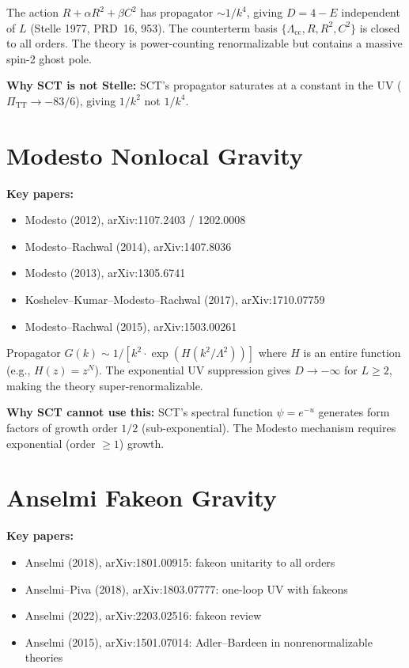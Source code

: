 \documentclass[12pt,a4paper]{article}
\begin{document}
The action $R + \alpha R^2 + \beta C^2$ has propagator $\sim 1/k^4$,
giving $D = 4 - E$ independent of $L$ (Stelle 1977, PRD~16, 953).
The counterterm basis $\{\Lambda_{\mathrm{cc}}, R, R^2, C^2\}$ is
closed to all orders. The theory is power-counting renormalizable but
contains a massive spin-2 ghost pole.

\textbf{Why SCT is not Stelle:} SCT's propagator saturates at a constant
in the UV ($\Pi_{\mathrm{TT}} \to -83/6$), giving $1/k^2$ not $1/k^4$.

\section{Modesto Nonlocal Gravity}
\label{sec:modesto}

\textbf{Key papers:}
\begin{itemize}
  \item Modesto (2012), arXiv:1107.2403 / 1202.0008
  \item Modesto--Rachwal (2014), arXiv:1407.8036
  \item Modesto (2013), arXiv:1305.6741
  \item Koshelev--Kumar--Modesto--Rachwal (2017), arXiv:1710.07759
  \item Modesto--Rachwal (2015), arXiv:1503.00261
\end{itemize}

Propagator $G(k) \sim 1/[k^2 \cdot \exp(H(k^2/\Lambda^2))]$ where
$H$ is an entire function (e.g., $H(z) = z^N$). The exponential UV
suppression gives $D \to -\infty$ for $L \geq 2$, making the theory
super-renormalizable.

\textbf{Why SCT cannot use this:} SCT's spectral function $\psi = e^{-u}$
generates form factors of growth order $1/2$ (sub-exponential). The
Modesto mechanism requires exponential (order $\geq 1$) growth.

\section{Anselmi Fakeon Gravity}
\label{sec:anselmi}

\textbf{Key papers:}
\begin{itemize}
  \item Anselmi (2018), arXiv:1801.00915: fakeon unitarity to all orders
  \item Anselmi--Piva (2018), arXiv:1803.07777: one-loop UV with fakeons
  \item Anselmi (2022), arXiv:2203.02516: fakeon review
  \item Anselmi (2015), arXiv:1501.07014: Adler--Bardeen in
    nonrenormalizable theories
\end{itemize}
\end{document}
